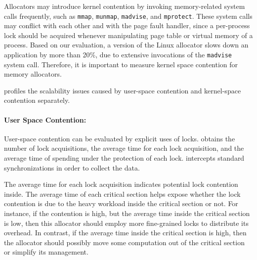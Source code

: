  
 Allocators may introduce kernel contention by invoking memory-related system calls frequently, such as \texttt{mmap}, \texttt{munmap}, \texttt{madvise}, and \texttt{mprotect}. These system calls may conflict with each other and with the page fault handler, since a per-process lock should be acquired whenever manipulating  page table or virtual memory of a process. Based on our evaluation, a version of the Linux allocator slows down an application by more than 20\%, due to extensive invocations of the \texttt{madvise} system call. Therefore, it is important to measure  kernel space contention for memory allocators.
 
 \label{sec:scaleidea}

\MP{} profiles the scalability issues caused by user-space contention and kernel-space contention separately. 

\paragraph{User Space Contention:} User-space contention can be evaluated by explicit uses of locks. \MP{} obtains the number of lock acquisitions, the average time for each lock acquisition, and the average time of spending under the protection of each lock. \MP{} intercepts standard synchronizations in order to collect the data. 

The average time for each lock acquisition indicates potential lock contention inside. The average time of each critical section helps expose whether the lock contention is due to the heavy workload inside the critical section or not. For instance, if the contention is high, but the average time inside the critical section is low, then this allocator should employ more fine-grained locks to distribute its overhead. In contrast, if the average time inside the critical section is high, then the allocator should possibly move some computation out of the critical section or simplify its management. 



